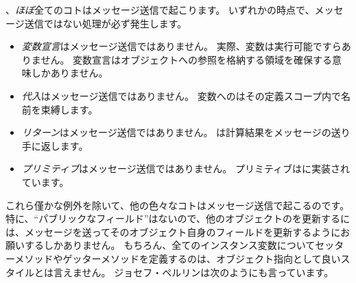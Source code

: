 \documentclass[a4paper,10pt,twoside]{book}
\begin{document}
、\emph{ほぼ}全てのコトはメッセージ送信で起こります。
いずれかの時点で、メッセージ送信ではない処理が必ず発生します。
\begin{itemize}
  \item \emph{変数宣言}はメッセージ送信ではありません。
		実際、変数は実行可能ですらありません。
		変数宣言はオブジェクトへの参照を格納する領域を確保する意味しかありません。
  \item \emph{代入}はメッセージ送信ではありません。
		変数へのはその定義スコープ内で名前を束縛します。
  \item \emph{リターン}はメッセージ送信ではありません。
		は計算結果をメッセージの送り手に返します。
  \item \emph{プリミティブ}はメッセージ送信ではありません。
		プリミティブはに実装されています。
\end{itemize}
これら僅かな例外を除いて、他の色々なコトはメッセージ送信で起こるのです。
特に、``パブリックなフィールド''はないので、他のオブジェクトのを更新するには、メッセージを送ってそのオブジェクト自身のフィールドを更新するようにお願いするしかありません。
もちろん、全てのインスタンス変数についてセッターメソッドやゲッターメソッドを定義するのは、オブジェクト指向として良いスタイルとは言えません。
ジョセフ・ペルリンは次のようにも言っています。
\end{document}
